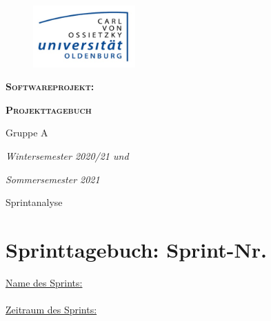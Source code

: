 \documentclass[12pt,a4paper, oneside]{article}
\author{Uni Oldenburg, SWP2020 Gruppe A}
\begin{document}
    \begin{titlepage}
        \pagestyle{empty}
        \begin{center}

            \begin{figure}[h]
                \centering
                \includegraphics[width=0.35\textwidth]{img/Logo.jpg}
            \end{figure}

            \bigskip \bigskip \noindent
            \textsc{\textbf{\LARGE Softwareprojekt:}} \par \bigskip \noindent
            \textsc{\textbf{\LARGE Projekttagebuch}}


            \par \bigskip \bigskip \bigskip \bigskip \bigskip \noindent
            {\Large Gruppe A} \par \medskip \noindent

            \par \bigskip \bigskip \bigskip \bigskip \bigskip \bigskip \noindent
            \textit{\Large Wintersemester 2020/21 und} \par \noindent
            \textit{\Large Sommersemester 2021}

            \par \bigskip \bigskip \bigskip \bigskip \bigskip \bigskip \noindent
            \par \bigskip \bigskip \bigskip \noindent
            {\Large Sprintanalyse} \par \medskip \noindent

        \end{center}
    \end{titlepage}

    \tableofcontents
    \pagebreak


    \section{Sprinttagebuch: Sprint-Nr.}
    \underline{Name des Sprints:}
    \\

    \noindent
    \\
    \underline{Zeitraum des Sprints:}
    \\
\end{document}
